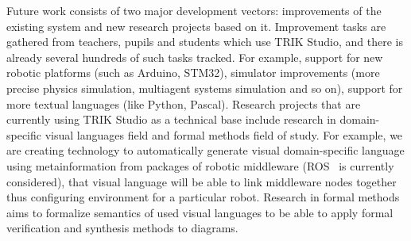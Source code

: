 \documentclass[conference]{IEEEtran}
\begin{document}
Future work consists of two major development vectors: improvements of the existing system and new research projects based on it. Improvement tasks are gathered from teachers, pupils and students which use TRIK Studio, and there is already several hundreds of such tasks tracked. For example, support for new robotic platforms (such as Arduino, STM32), simulator improvements (more precise physics simulation, multiagent systems simulation and so on), support for more textual languages (like Python, Pascal). Research projects that are currently using TRIK Studio as a technical base include research in domain-specific visual languages field and formal methods field of study. For example, we are creating technology to automatically generate visual domain-specific language using metainformation from packages of robotic middleware (ROS~\cite{quigley2009ros} is currently considered), that visual language will be able to link middleware nodes together thus configuring environment for a particular robot. Research in formal methods aims to formalize semantics of used visual languages to be able to apply formal verification and synthesis methods to diagrams.

%


\end{document}
